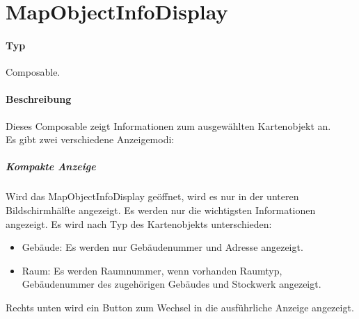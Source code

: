 \section{MapObjectInfoDisplay}
\paragraph*{Typ}
Composable.
\paragraph*{Beschreibung}
Dieses Composable zeigt Informationen zum ausgewählten Kartenobjekt an.\\
Es gibt zwei verschiedene Anzeigemodi:

\subparagraph*{Kompakte Anzeige}
Wird das MapObjectInfoDisplay geöffnet, wird es nur in der unteren Bildschirmhälfte angezeigt. 
Es werden nur die wichtigsten Informationen angezeigt. Es wird nach Typ des Kartenobjekts unterschieden:
\begin{itemize}
    \item Gebäude: Es werden nur Gebäudenummer und Adresse angezeigt.
    \item Raum: Es werden Raumnummer, wenn vorhanden Raumtyp, Gebäudenummer des zugehörigen Gebäudes und Stockwerk angezeigt.
\end{itemize}
Rechts unten wird ein Button zum Wechsel in die ausführliche Anzeige angezeigt.

